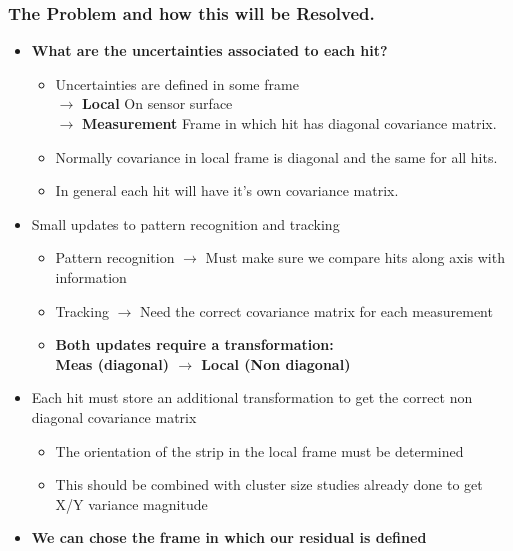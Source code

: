 \documentclass{beamer}
\begin{document}
\begin{frame}
\frametitle{The Problem and how this will be Resolved.}
\begin{itemize}
\item \textbf{What are the uncertainties associated to each hit?}
\begin{itemize}
\item Uncertainties are defined in some frame \\$\rightarrow$ \textbf{Local} On sensor surface \\ $\rightarrow$ \textbf{Measurement} Frame in which hit has diagonal covariance matrix.
\item Normally covariance in local frame is diagonal and the same for all hits.
\item In general each hit will have it's own covariance matrix. 
\end{itemize} 
\item Small updates to pattern recognition and tracking
\begin{itemize}
\item Pattern recognition $\rightarrow$ Must make sure we compare hits along axis with information
\item Tracking $\rightarrow$ Need the correct covariance matrix for each measurement
\item \textbf{Both updates require a transformation: \\ Meas (diagonal) $\rightarrow$ Local (Non diagonal) } 
\end{itemize} 
\item Each hit must store an additional transformation to get the correct non diagonal covariance matrix 
\begin{itemize}
\item The orientation of the strip in the local frame must be determined
\item This should be combined with cluster size studies already done to get X/Y variance magnitude 
\end{itemize}  
\item \textbf{We can chose the frame in which our residual is defined}
\end{itemize}

\end{frame}
\end{document}
